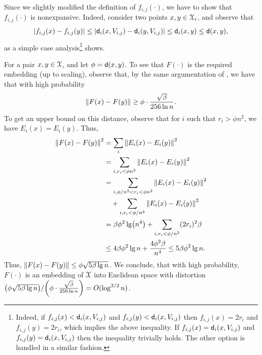 Since we slightly modified the definition of $f_{i,j}(\cdot)$, we have
to show that $f_{i,j}(\cdot)$ is nonexpansive. Indeed, consider two
points $x,y \in \FMS_i$, and observe that
\begin{equation*}
\left| {f_{i,j}(x) - f_{i,j}(y) } \right| \leq \left| {\mathsf{d}_i(x, V_{i,j}) - 
\mathsf{d}_i(y, V_{i,j})} \right| \leq \mathsf{d}_i(x,y) \leq  \mathsf{d}(x,y),
\end{equation*}
as a simple case analysis\footnote{Indeed, if
   $f_{i,j}(x) < \mathsf{d}_i(x, V_{i,j})$ and
   $f_{i,j}(y) < \mathsf{d}_i(x, V_{i,j})$ then $f_{i,j}(x) = 2 r_i$
   and $f_{i,j}(y) = 2 r_i$, which implies the above inequality.  If
   $f_{i,j}(x) = \mathsf{d}_i(x, V_{i,j})$ and
   $f_{i,j}(y) = \mathsf{d}_i(x, V_{i,j})$ then the inequality
   trivially holds. The other option is handled in a similar fashion.}
shows.



For a pair $x,y \in \FMS$, and let $\phi =\mathsf{d}(x,y)$.  To see that
$F(\cdot)$ is the required embedding (up to scaling), observe that, by
the same argumentation of , we have that
with high probability 
\begin{equation*}
    \left\| {F(x)- F(y)} \right\| \geq \phi \cdot \frac{\sqrt{\beta}}{256 \ln n}.
\end{equation*}
To get an upper bound on this distance, observe that for $i$ such that
$r_i > \phi n^2$, we have $E_i(x) = E_i(y)$. Thus,
\begin{align*}
  \dist{F(x) - F(y)}^2%
  &=%
    \sum_i \dist{E_i(x) - E_i(y)}^2
    \\&= \sum_{i, r_i <
    \phi n^2} \dist{E_i(x) - E_i(y)}^2\\
  &=%
    \sum_{i, \phi/n^2 < r_i < \phi
    n^2 } \dist{E_i(x) - E_i(y)}^2
    \\&\quad + \sum_{i, r_i < \phi/ n^2 }
    \dist{E_i(x) - E_i(y)}^2 \\
  &=%
    \beta \phi^2 \lg \pth{n^4} +
    \sum_{i, r_i < \phi/n^2} (2r_i)^2 \beta
    \\&
    \leq 4\beta \phi^2 \lg n + \frac{4\phi^2\beta}{n^4 }
    \leq 5\beta \phi^2 \lg n.
\end{align*}
Thus, $\left\| {F(x) - F(y)} \right\| \leq \phi \sqrt{5 \beta \lg n}$. We conclude,
that with high probability, $F(\cdot)$ is an embedding of $\FMS$ into
Euclidean space with distortion $\nfrac{\pth{\phi \sqrt{5 \beta \lg
         n}}}{\pth{\phi \cdot \frac{\sqrt{\beta}}{256 \ln n}}} = O(
\log^{3/2} n)$. 

